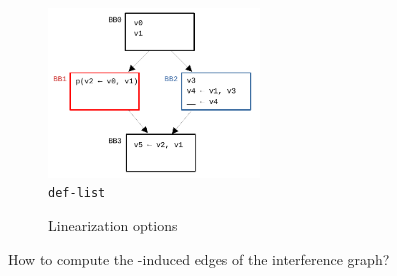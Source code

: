 \documentclass[12pt]{article}
\begin{document}
\begin{figure}[t!]
  \centering
  \includegraphics[width=0.5\textwidth]{cfg}
  \caption{\texttt{def-list} }
\end{figure}

\begin{figure}[t!]
  \centering
   \hfill
  \caption{Linearization options}
  \label{fig:linearization-options}
\end{figure}

How to compute the \AMi-induced edges of the interference graph?
\end{document}
